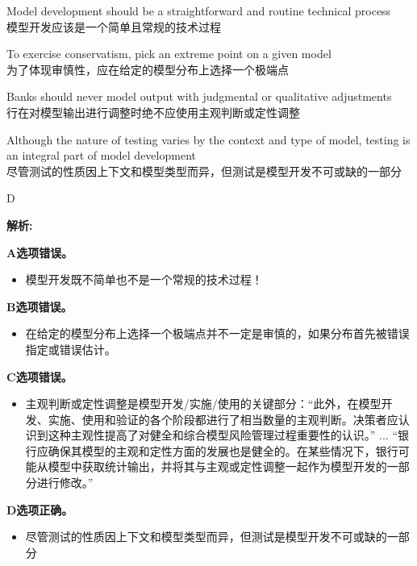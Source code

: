 \documentclass{article}
\newenvironment{explanation}
{\textbf{解析:}\par}
{\par}
\begin{document}
  \begin{choices}
      \item Model development should be a straightforward and routine technical process\\
      模型开发应该是一个简单且常规的技术过程
      \item To exercise conservatism, pick an extreme point on a given model\\为了体现审慎性，应在给定的模型分布上选择一个极端点
      \item Banks should never model output with judgmental or qualitative adjustments\\行在对模型输出进行调整时绝不应使用主观判断或定性调整
      \item Although the nature of testing varies by the context and type of model, testing is an integral part of model development\\尽管测试的性质因上下文和模型类型而异，但测试是模型开发不可或缺的一部分
  \end{choices}
  
  \begin{correctanswer}
      D
  \end{correctanswer}
  
  \begin{explanation}
    \textbf{A选项错误。} 
    \begin{itemize}
        \item 模型开发既不简单也不是一个常规的技术过程！
    \end{itemize}

    \textbf{B选项错误。} 
    \begin{itemize}
        \item 在给定的模型分布上选择一个极端点并不一定是审慎的，如果分布首先被错误指定或错误估计。
    \end{itemize}

    \textbf{C选项错误。} 
    \begin{itemize}
        \item 主观判断或定性调整是模型开发/实施/使用的关键部分：“此外，在模型开发、实施、使用和验证的各个阶段都进行了相当数量的主观判断。决策者应认识到这种主观性提高了对健全和综合模型风险管理过程重要性的认识。” ... “银行应确保其模型的主观和定性方面的发展也是健全的。在某些情况下，银行可能从模型中获取统计输出，并将其与主观或定性调整一起作为模型开发的一部分进行修改。”
    \end{itemize}

    \textbf{D选项正确。} 
    \begin{itemize}
        \item 尽管测试的性质因上下文和模型类型而异，但测试是模型开发不可或缺的一部分
    \end{itemize}   
  \end{explanation}
  
\end{document}
